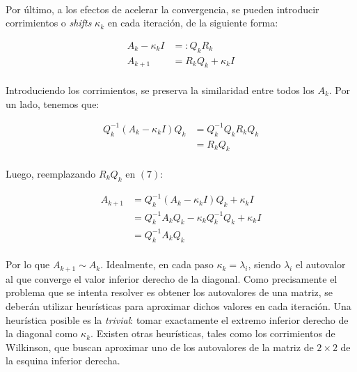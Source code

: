 \documentclass[12pt, twocolumn]{article}
\begin{document}
	\paragraph{} Por último, a los efectos de acelerar la convergencia, se pueden introducir corrimientos o \textit{shifts} $\kappa_{k}$ en cada iteración, de la siguiente forma:
	
	\begin{align}
		A_{k} - \kappa_{k}I &=: Q_{k}R_{k} \\
		A_{k+1} &= R_{k}Q_{k} + \kappa_{k}I 
	\end{align}
	
	\paragraph{} Introduciendo los corrimientos, se preserva la similaridad entre todos los $A_{k}$. Por un lado, tenemos que:
	
	\begin{align}
		Q_{k}^{-1}(A_{k} - \kappa_{k}I)Q_{k} &= Q_{k}^{-1}Q_{k}R_{k}Q_{k}  \\ &= R_{k}Q_{k}
	\end{align}
	
	\paragraph{} Luego, reemplazando $R_{k}Q_{k}$ en $(7)$:
	
	\begin{align}
		A_{k+1} &= Q_{k}^{-1}(A_{k} - \kappa_{k}I)Q_{k} + \kappa_{k}I \\ &= Q_{k}^{-1}A_{k}Q_{k} - \kappa_{k}Q_{k}^{-1}Q_{k} + \kappa_{k}I  \\ &= Q_{k}^{-1}A_{k}Q_{k}  
	\end{align}
	
	\paragraph{} Por lo que $A_{k+1} \sim A_{k}$. Idealmente, en cada paso $\kappa_{k} = \lambda_{i}$, siendo $\lambda_{i}$ el autovalor al que converge el valor inferior derecho de la diagonal. Como precisamente el problema que se intenta resolver es obtener los autovalores de una matriz, se deberán utilizar heurísticas para aproximar dichos valores en cada iteración. Una heurística posible es la \textit{trivial}: tomar exactamente el extremo inferior derecho de la diagonal como $\kappa_{k}$. Existen otras heurísticas, tales como los corrimientos de Wilkinson, que buscan aproximar uno de los autovalores de la matriz de $2\times2$ de la esquina inferior derecha.
	
\end{document}
